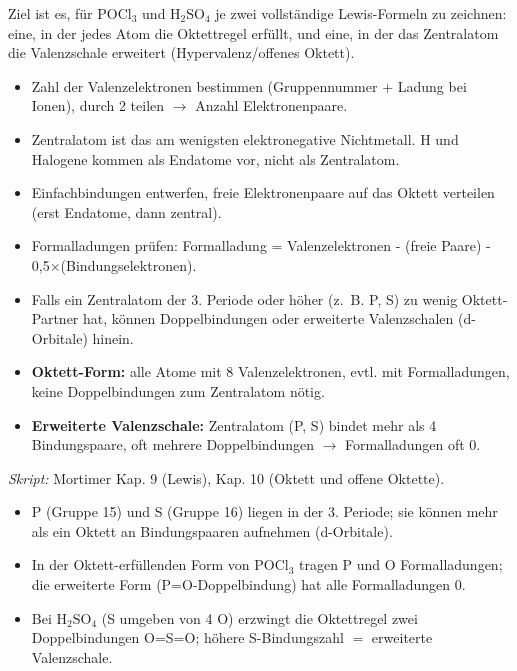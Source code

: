

Ziel ist es, f\"ur $\mathrm{POCl_3}$ und $\mathrm{H_2SO_4}$ je zwei
vollst\"andige Lewis-Formeln zu zeichnen: eine, in der jedes Atom die
Oktettregel erf\"ullt, und eine, in der das Zentralatom die Valenzschale
erweitert (Hypervalenz/offenes Oktett).

\begin{werkzeugkasten}
\begin{itemize}
  \item Zahl der Valenzelektronen bestimmen (Gruppennummer $+$ Ladung bei
        Ionen), durch 2 teilen $\rightarrow$ Anzahl Elektronenpaare.
  \item Zentralatom ist das am wenigsten elektronegative Nichtmetall.
        $\mathrm{H}$ und Halogene kommen als Endatome vor, nicht als
        Zentralatom.
  \item Einfachbindungen entwerfen, freie Elektronenpaare auf das Oktett
        verteilen (erst Endatome, dann zentral).
  \item Formal\-ladungen pr\"ufen: Formalladung = Valenzelektronen -
        (freie Paare) - 0{,}5$\times$(Bindungselektronen).
  \item Falls ein Zentralatom der 3. Periode oder h\"oher (z.~B. P, S) zu
        wenig Oktett-Partner hat, k\"onnen Doppelbindungen oder erweiterte
        Valenzschalen (d-Orbitale) hinein.
\item \textbf{Oktett-Form:} alle Atome mit 8 Valenzelektronen, evtl. mit
      Formalladungen, keine Doppelbindungen zum Zentralatom n\"otig.
  \item \textbf{Erweiterte Valenzschale:} Zentralatom (P, S) bindet mehr
        als 4 Bindungspaare, oft mehrere Doppelbindungen $\rightarrow$
        Formalladungen oft 0.
\end{itemize}
\textit{Skript:} Mortimer Kap. 9 (Lewis), Kap. 10 (Oktett und offene
Oktette).
\end{werkzeugkasten}

\begin{achtung}
\begin{itemize}
  \item P (Gruppe 15) und S (Gruppe 16) liegen in der 3. Periode; sie
        k\"onnen mehr als ein Oktett an Bindungspaaren aufnehmen (d-Orbitale).
  \item In der Oktett-erf\"ullenden Form von $\mathrm{POCl_3}$ tragen P und
        O Formalladungen; die erweiterte Form (P=O-Doppelbindung) hat alle
        Formalladungen 0.
  \item Bei $\mathrm{H_2SO_4}$ (S umgeben von 4 O) erzwingt die Oktettregel
        zwei Doppelbindungen O=S=O; h\"ohere S-Bindungszahl $=$ erweiterte
        Valenzschale.
\end{itemize}
\end{achtung}
